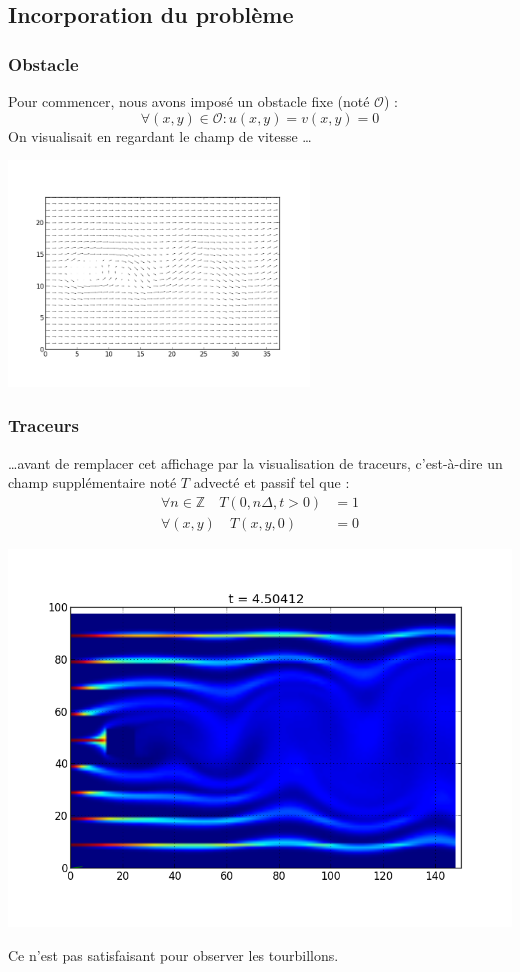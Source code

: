\documentclass{beamer}
\renewcommand\O{\mathcal{O}}
\begin{document}
  \subsection{Incorporation du problème}
  \begin{frame}
    \frametitle{Obstacle}
    Pour commencer, nous avons imposé un obstacle fixe (noté $\O$) :
    \[ \forall (x,y) \in \O : u(x,y) = v(x,y) = 0 \]
    On visualisait en regardant le champ de vitesse \dots
    \begin{center}
      \includegraphics[width=0.6\textwidth]{quiver.png}
    \end{center}
  \end{frame}
  \begin{frame}
    \frametitle{Traceurs}
    \dots avant de remplacer cet affichage par la visualisation de
    traceurs, c'est-à-dire un champ supplémentaire noté $T$ advecté et
    passif tel que :
    \begin{align*}
      \forall n\in \mathbb{Z}\quad T(0,n \Delta, t>0) & = 1\\
      \forall (x,y)\quad T(x,y,0) & = 0
    \end{align*}
    \begin{center}
      \includegraphics[height=0.6\textheight]{tracer0.png}
    \end{center}
    Ce n'est pas satisfaisant pour observer les tourbillons.
  \end{frame}
  
\end{document}
